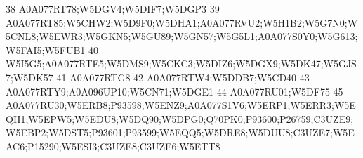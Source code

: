 \documentclass{beamer}
\begin{document}
\begin{frame}[fragile]
\begin{itemize}
\begin{Schunk}
\begin{Soutput}
38                                                                                                                                                                                                                                                                                                                                                A0A077RT78;W5DGV4;W5DIF7;W5DGP3
39                                                                                                                                                                                                                                             A0A077RT85;W5CHW2;W5D9F0;W5DHA1;A0A077RVU2;W5H1B2;W5G7N0;W5CNL8;W5EWR3;W5GKN5;W5GU89;W5GN57;W5G5L1;A0A077S0Y0;W5G613;W5FAI5;W5FUB1
40                                                                                                                                                                                                                                                                                                             W5I5G5;A0A077RTE5;W5DMS9;W5CKC3;W5DIZ6;W5DGX9;W5DK47;W5GJS7;W5DK57
41                                                                                                                                                                                                                                                                                                                                                                     A0A077RTG8
42                                                                                                                                                                                                                                                                                                                                                       A0A077RTW4;W5DDB7;W5CD40
43                                                                                                                                                                                                                                                                                                                                            A0A077RTY9;A0A096UP10;W5CN71;W5DGE1
44                                                                                                                                                                                                                                                                                                                                                              A0A077RU01;W5DF75
45                                                                                                                                                      A0A077RU30;W5ERB8;P93598;W5ENZ9;A0A077S1V6;W5ERP1;W5ERR3;W5EQH1;W5EPW5;W5EDU8;W5DQ90;W5DPG0;Q70PK0;P93600;P26759;C3UZE9;W5EBP2;W5DST5;P93601;P93599;W5EQQ5;W5DRE8;W5DUU8;C3UZE7;W5EAC6;P15290;W5ESI3;C3UZE8;C3UZE6;W5ETT8

\end{Soutput}
\end{Schunk}
\end{itemize}
\end{frame}
\end{document}
